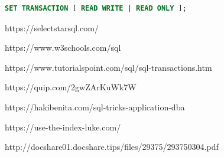 \documentclass{article}
\begin{document}
\vspace{8pt} \begin{lstlisting}[language=SQL]
SET TRANSACTION [ READ WRITE | READ ONLY ];
\end{lstlisting} \vspace{8pt}

\begin{thebibliography}{}

\bibitem[]{}
https://selectstarsql.com/

\bibitem[]{}
https://www.w3schools.com/sql

\bibitem[]{}
https://www.tutorialspoint.com/sql/sql-transactions.htm

\bibitem[]{}
https://quip.com/2gwZArKuWk7W

\bibitem[]{}
https://hakibenita.com/sql-tricks-application-dba

\bibitem[]{}
https://use-the-index-luke.com/

http://docshare01.docshare.tips/files/29375/293750304.pdf

\end{thebibliography}
\end{document}
